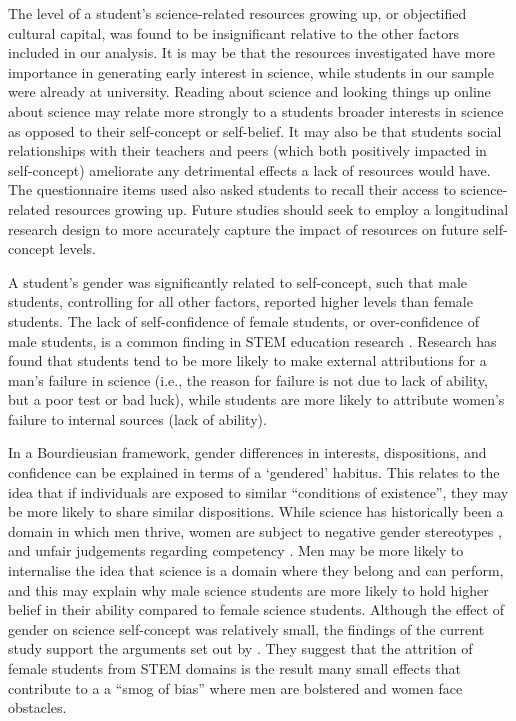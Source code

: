 The level of a student's science-related resources growing up, or objectified cultural capital, was found to be insignificant relative to the other factors included in our analysis. It is may be that the resources investigated have more importance in generating early interest in science, while students in our sample were already at university. Reading about science and looking things up online about science may relate more strongly to a students broader interests in science as opposed to their self-concept or self-belief. It may also be that students social relationships with their teachers and peers (which both positively impacted in self-concept) ameliorate any detrimental effects a lack of resources would have. The questionnaire items used also asked students to recall their access to science-related resources growing up. Future studies should seek to employ a longitudinal research design to more accurately capture the impact of resources on future self-concept levels. 

A student's gender was significantly related to self-concept, such that male students, controlling for all other factors, reported higher levels than female students. The lack of self-confidence of female students, or over-confidence of male students, is a common finding in STEM education research \cite{sax2015but, Ellis_2016}. Research has found that students tend to be more likely to make external attributions for a man's failure in science (i.e., the reason for failure is not due to lack of ability, but a poor test or bad luck), while students are more likely to attribute women's failure to internal sources (lack of ability)\cite{LaCosse_2016}. 

In a Bourdieusian framework, gender differences in interests, dispositions, and confidence can be explained in terms of a `gendered' habitus. This relates to the idea that if individuals are exposed to similar ``conditions of existence'', they may be more likely to share similar dispositions. While science has historically been a domain in which men thrive, women are subject to negative gender stereotypes \cite{Nosek_2009}, and unfair judgements regarding competency \cite{Moss_2012, Barthelemy_2016}. Men may be more likely to internalise the idea that science is a domain where they belong and can perform, and this may explain why male science students are more likely to hold higher belief in their ability compared to female science students.  Although the effect of gender on science self-concept was relatively small, the findings of the current study support the arguments set out by \cite{Kost_Smith_2010}. They suggest that the attrition of female students from STEM domains is the result many small effects that contribute to a a ``smog of bias'' where men are bolstered and women face obstacles. 

